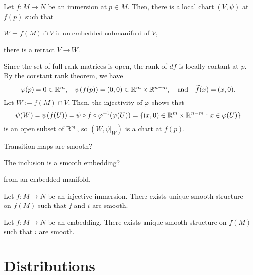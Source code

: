 \documentclass{../../large}
\begin{document}
\begin{prb}
Let $f:M\to N$ be an immersion at $p\in M$.
Then, there is a local chart $(V,\psi)$ at $f(p)$ such that
\begin{parts}
\item $W=f(M)\cap V$ is an embedded submanifold of $V$,
\item there is a retract $V\to W$.
\end{parts}
\end{prb}
\begin{pf}
Since the set of full rank matrices is open, the rank of $df$ is locally contant at $p$.
By the constant rank theorem, we have
\[\varphi(p)=0\in\mathbb{R}^m,\quad\psi(f(p))=(0,0)\in\mathbb{R}^m\times\mathbb{R}^{n-m},\quad\text{and}\quad\widetilde f(x)=(x,0).\]
Let $W:=f(M)\cap V$.
Then, the injectivity of $\varphi$ shows that
\[\psi(W)=\psi(f(U))=\psi\circ f\circ\varphi^{-1}(\varphi(U))=\{(x,0)\in\mathbb{R}^m\times\mathbb{R}^{n-m}:x\in\varphi(U)\}\]
is an open subset of $\mathbb{R}^m$, so $(W,\psi|_W)$ is a chart at $f(p)$.

Transition maps are smooth?

The inclusion is a smooth embedding?
\end{pf}

\begin{prb}
from an embedded manifold.
\end{prb}


Let $f:M\to N$ be an injective immersion.
There exists unique smooth structure on $f(M)$ such that $f$ and $i$ are smooth.

Let $f:M\to N$ be an embedding.
There exists unique smooth structure on $f(M)$ such that $i$ are smooth.



\section{Distributions}
\begin{prb}[Foliation]
\end{prb}
\end{document}
